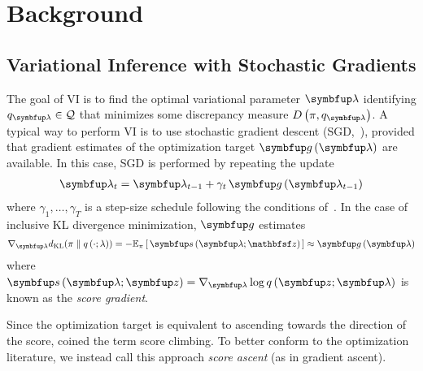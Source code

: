 
\section{Background}
\subsection{Variational Inference with Stochastic Gradients}\label{section:ivi_previous}
The goal of VI is to find the optimal variational parameter \(\vlambda\) identifying \(q_{\vlambda} \in \mathcal{Q}\) that minimizes some discrepancy measure \(D\left(\pi, q_{\vlambda}\right)\).
A typical way to perform VI is to use stochastic gradient descent (SGD,~\citealt{robbins_stochastic_1951}), provided that gradient estimates of the optimization target \(\vg\,(\vlambda)\) are available.
In this case, SGD is performed by repeating the update
{%
\begin{align*}
  \vlambda_{t} = \vlambda_{t-1} + \gamma_{t} \, \vg\left(\vlambda_{t-1}\right)
\end{align*}
}
where \(\gamma_1, \ldots, \gamma_T\) is a step-size schedule following the conditions of~\citet{robbins_stochastic_1951, bottou_online_1999}.
In the case of inclusive KL divergence minimization, \(\vg\) estimates
%
{%
\begin{align*}
  \nabla_{\vlambda} \DKL{\pi}{q\left(\cdot; \lambda\right)}
  = -\Esub{\pi}{ \vs\,(\vlambda; \rvvz) } 
  \approx \vg\left(\vlambda\right)
\end{align*}
}%
%
where \(\vs\,(\vlambda;\vz) = \nabla_{\vlambda} \log q\,(\vz; \vlambda)\) is known as the \textit{score gradient}.

Since the optimization target is equivalent to ascending towards the direction of the score, \citet{NEURIPS2020_b2070693} coined the term score climbing.
To better conform to the optimization literature, we instead call this approach \textit{score ascent} (as in gradient ascent).

